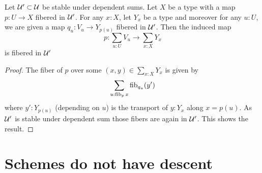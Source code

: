 \documentclass{article}
\begin{document}
\begin{lemma}{\label{lemma:AtlasSum}}
	Let $\mathcal{U}' \subset \mathcal{U}$ be stable under dependent sums.
	Let $X$ be a type with a  map $p : U \to X$ fibered in $\mathcal{U}'$.  For any $x : X$, let $Y_x$ be a type and moreover for any $u : U$, we are given a map $q_u : V_u \to Y_{p(u)}$ fibered in $\mathcal{U}'$. Then the induced map
	\[
	p : \sum_{u : U} V_u \to \sum_{x : X} Y_{x}
	\]
	is fibered in $\mathcal{U}'$
\end{lemma}
\begin{proof}
	The fiber of $p$ over some $(x,y) \in \sum_{x :X} Y_x$ is given by
	\[
	\sum_{u : \operatorname{fib}_p x} \operatorname{fib}_{q_u} (y') 
	\]
	where $y' : Y_{p(u)}$ (depending on $u$) is the transport of $y : Y_x$ along $x = p(u)$. As $\mathcal{U}'$ is stable under dependent sum %
	those fibers are again in $\mathcal{U}'$. This shows the result.
\end{proof}











\section{Schemes do not have descent}




\end{document}
